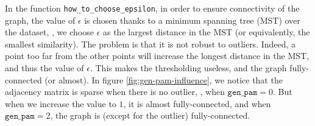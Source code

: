 \documentclass[a4paper, 11pt]{article}
\begin{document}
    In the function \texttt{how\_to\_choose\_epsilon}, in order to ensure connectivity of the graph, the value of $\epsilon$ is chosen thanks to a minimum spanning tree (MST) over the dataset, \ie, we choose $\epsilon$ as the largest distance in the MST (or equivalently, the smallest similarity). The problem is that it is not robust to outliers. Indeed, a point too far from the other points will increase the longest distance in the MST, and thus the value of $\epsilon$. This makes the thresholding useless, and the graph fully-connected (or almost). In figure \ref{fig:gen-pam-influence}, we notice that the adjacency matrix is sparse when there is no outlier, \ie, when $\texttt{gen\_pam} = 0$. But when we increase the value to $1$, it is almost fully-connected, and when $\texttt{gen\_pam} = 2$, the graph is (except for the outlier) fully-connected.
    
\end{document}
